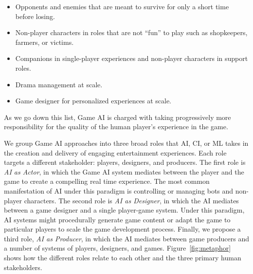 \documentclass[conference]{IEEEtran}
\begin{document}
\begin{itemize}
\item Opponents and enemies that are meant to survive for only a short time before losing.
\item Non-player characters in roles that are not ``fun'' to play such as shopkeepers, farmers, or victims.
\item Companions in single-player experiences and non-player characters in support roles.
\item Drama management at scale.
\item Game designer for personalized experiences at scale.
\end{itemize}

\noindent
As we go down this list, Game AI is charged with taking progressively more responsibility for the quality of the human player's experience in the game.

%
We group Game AI approaches into three broad roles that AI, CI, or ML takes in the creation and delivery of engaging entertainment experiences.
Each role targets a different stakeholder: players, designers, and producers.
The first role is {\em AI as Actor}, in which the Game AI system mediates between the player and the game to create a compelling real time experience.
The most common manifestation of AI under this paradigm is controlling or managing bots and non-player characters.
The second role is {\em AI as Designer}, in which the AI mediates between a game designer and a single player-game system.
Under this paradigm, AI systems might procedurally generate game content or adapt the game to particular players to scale the game development process.
Finally, we propose a third role, {\em AI as Producer}, in which the AI mediates between game producers and a number of systems of players, designers, and games.
Figure~\ref{fig:metaphor} shows how the different roles relate to each other and the three primary human stakeholders.
\end{document}
